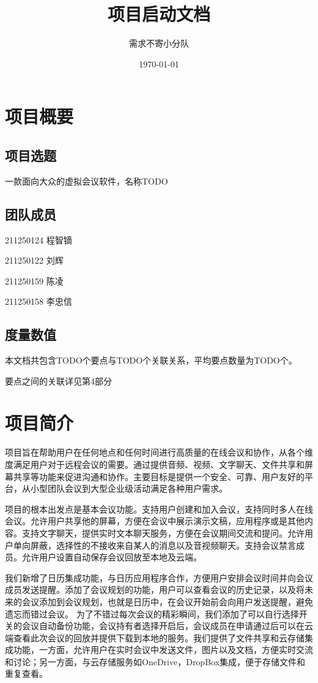 \documentclass[a4paper,12pt]{article}
\title{项目启动文档}
\author{需求不寄小分队}
\date{\today}
\begin{document}
\maketitle

\tableofcontents

\section{项目概要}

\subsection{项目选题}
一款面向大众的虚拟会议软件，名称TODO
\subsection{团队成员}
211250124 程智镝

211250122 刘辉

211250159 陈凌

211250158 李忠信
\subsection{度量数值}
本文档共包含TODO个要点与TODO个关联关系，平均要点数量为TODO个。

要点之间的关联详见第4部分

\section{项目简介}
项目旨在帮助用户在任何地点和任何时间进行高质量的在线会议和协作，从各个维度满足用户对于远程会议的需要。通过提供音频、视频、文字聊天、文件共享和屏幕共享等功能来促进沟通和协作。主要目标是提供一个安全、可靠、用户友好的平台，从小型团队会议到大型企业级活动满足各种用户需求。

项目的根本出发点是基本会议功能。支持用户创建和加入会议，支持同时多人在线会议。允许用户共享他的屏幕，方便在会议中展示演示文稿，应用程序或是其他内容。支持文字聊天，提供实时文本聊天服务，方便在会议期间交流和提问。允许用户单向屏蔽，选择性的不接收来自某人的消息以及音视频聊天。支持会议禁言成员。允许用户设置自动保存会议回放至本地及云端。

我们新增了日历集成功能，与日历应用程序合作，方便用户安排会议时间并向会议成员发送提醒。添加了会议规划的功能，用户可以查看会议的历史记录，以及将未来的会议添加到会议规划，也就是日历中，在会议开始前会向用户发送提醒，避免遗忘而错过会议。
为了不错过每次会议的精彩瞬间，我们添加了可以自行选择开关的会议自动备份功能，会议持有者选择开启后，会议成员在申请通过后可以在云端查看此次会议的回放并提供下载到本地的服务。我们提供了文件共享和云存储集成功能，一方面，允许用户在实时会议中发送文件，图片以及文档，方便实时交流和讨论；另一方面，与云存储服务如OneDrive，DropBox集成，便于存储文件和重复查看。
\end{document}

